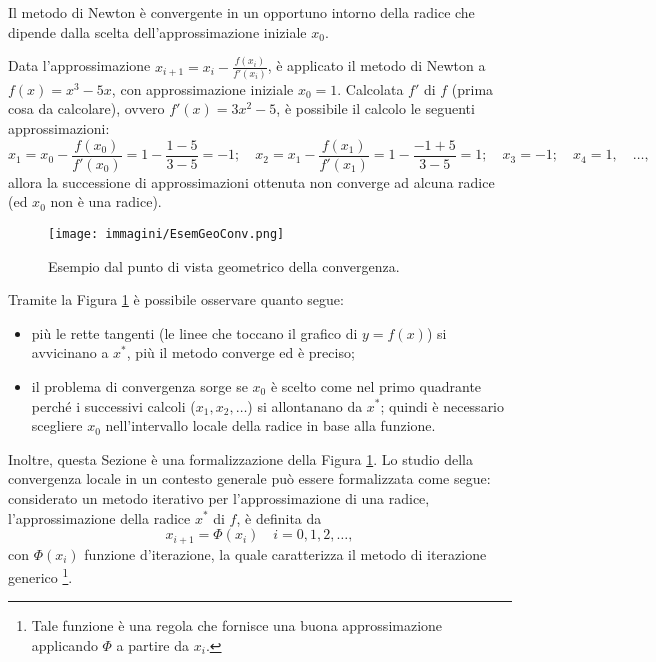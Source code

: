 Il metodo di Newton è convergente in un opportuno intorno della radice che dipende dalla scelta dell'approssimazione iniziale $x_0$.
\begin{example} 
	Data l'approssimazione $x_{i+1}=x_i-\frac{f(x_i)}{f'(x_i)}$, è applicato il metodo di Newton a $f(x)=x^3-5x$, con approssimazione iniziale $x_0=1$. Calcolata $f'$ di $f$ (prima cosa da calcolare), ovvero $f'(x)=3x^2-5$, è possibile il calcolo le seguenti approssimazioni:
	\begin{equation*}
		x_1=x_0-\frac{f(x_0)}{f'(x_0)}=1-\frac{1-5}{3-5}=-1;\quad x_2=x_1-\frac{f(x_1)}{f'(x_1)}=1-\frac{-1+5}{3-5}=1;\quad x_3=-1;\quad x_4=1,\quad\hdots,
	\end{equation*}
	allora la successione di approssimazioni ottenuta non converge ad alcuna radice (ed $x_0$ non è una radice).
\end{example}

\begin{figure}
	\centering
	\texttt{[image: immagini/EsemGeoConv.png]}
	\caption{\label{fig:esempio_geometrico_convergenza}Esempio dal punto di vista geometrico della convergenza.}
\end{figure}

Tramite la Figura \ref{fig:esempio_geometrico_convergenza} è possibile osservare quanto segue:
 \begin{itemize}
	\item più le rette tangenti (le linee che toccano il grafico di $y=f(x)$) si avvicinano a $x^*$, più  il metodo converge ed è preciso;
	\item il problema di convergenza sorge se $x_0$ è scelto come nel primo quadrante perché i successivi calcoli ($x_1, x_2, \hdots$) si allontanano da $x^*$; quindi è necessario scegliere $x_0$ nell'intervallo locale della radice in base alla funzione.
\end{itemize}

Inoltre, questa Sezione è una formalizzazione della Figura \ref{fig:esempio_geometrico_convergenza}.
Lo studio della convergenza locale in un contesto generale può essere formalizzata come segue: considerato un metodo iterativo per l'approssimazione di una radice, l'approssimazione della radice $x^*$ di $f$, è definita da
\begin{equation}\label{eq:funzione_iterazione}
	x_{i+1}=\Phi (x_i)\quad i=0,1,2,\hdots,
\end{equation}
con $\Phi (x_i)$ funzione d'iterazione, la quale caratterizza il metodo di iterazione generico \footnote{Tale funzione è una regola che fornisce una buona approssimazione applicando $\Phi$ a partire da $x_i$.}.

